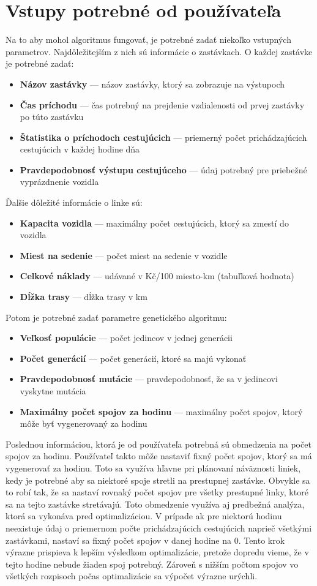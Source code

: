 \section{Vstupy potrebné od používateľa}
Na to aby mohol algoritmus fungovať, je potrebné zadať niekoľko vstupných parametrov.
Najdôležitejším z nich sú informácie o zastávkach. O každej zastávke je potrebné zadať:
\begin{itemize}
  \item \textbf{Názov zastávky} --- názov zastávky, ktorý sa zobrazuje na výstupoch
  \item \textbf{Čas príchodu} --- čas potrebný na prejdenie vzdialenosti od prvej zastávky po túto zastávku
  \item \textbf{Štatistika o príchodoch cestujúcich} --- priemerný počet prichádzajúcich cestujúcich v každej hodine dňa
  \item \textbf{Pravdepodobnosť výstupu cestujúceho} --- údaj potrebný pre priebežné vyprázdnenie vozidla
\end{itemize}
Ďalšie dôležité informácie o linke sú:
\begin{itemize}
  \item \textbf{Kapacita vozidla} --- maximálny počet cestujúcich, ktorý sa zmestí do vozidla
  \item \textbf{Miest na sedenie} --- počet miest na sedenie v vozidle
  \item \textbf{Celkové náklady} --- udávané v Kč/100 miesto-km (tabuľková hodnota) 
  \item \textbf{Dĺžka trasy} --- dĺžka trasy v km
\end{itemize}
Potom je potrebné zadať parametre genetického algoritmu:
\begin{itemize}
  \item \textbf{Veľkosť populácie} --- počet jedincov v jednej generácii
  \item \textbf{Počet generácií} --- počet generácií, ktoré sa majú vykonať
  \item \textbf{Pravdepodobnosť mutácie} --- pravdepodobnosť, že sa v jedincovi vyskytne mutácia
  \item \textbf{Maximálny počet spojov za hodinu} --- maximálny počet spojov, ktorý môže byť vygenerovaný za hodinu
\end{itemize}
Poslednou informáciou, ktorá je od používateľa potrebná sú obmedzenia na počet spojov za hodinu.
Používateľ takto môže nastaviť fixný počet spojov, ktorý sa má vygenerovať za hodinu.
Toto sa využíva hľavne pri plánovaní náväznosti liniek, kedy je potrebné aby sa niektoré spoje stretli na prestupnej zastávke.
Obvykle sa to robí tak, že sa nastaví rovnaký počet spojov pre všetky prestupné linky, ktoré sa na tejto zastávke stretávajú.
Toto obmedzenie využíva aj predbežná analýza, ktorá sa vykonáva pred optimalizáciou.
V prípade ak pre niektorú hodinu neexistuje údaj o priemernom počte prichádzajúcich cestujúcich naprieč všetkými zastávkami, nastaví sa fixný počet spojov v danej hodine na 0.
Tento krok výrazne prispieva k lepším výsledkom optimalizácie, pretože dopredu vieme, že v tejto hodine nebude žiaden spoj potrebný.
Zároveň s nižším počtom spojov vo všetkých rozpisoch počas optimalizácie sa výpočet výrazne urýchli.

